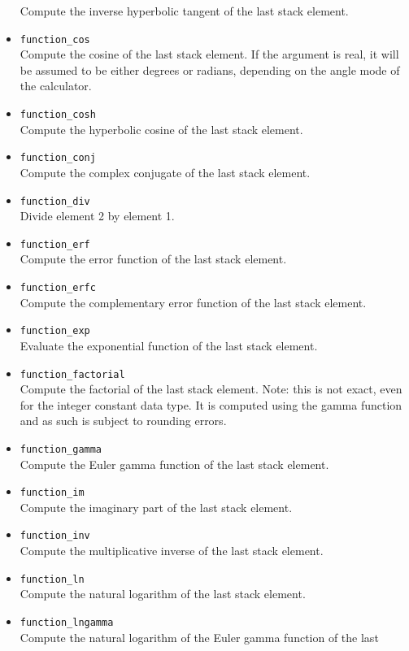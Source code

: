 \documentclass[11pt,notitlepage]{article}
\begin{document}
\begin{itemize}
      Compute the inverse hyperbolic tangent of the last stack element.
   \item {\tt function\_cos} \\
      Compute the cosine of the last stack element.  If the argument is real,
      it will be assumed to be either degrees or radians, depending on the
      angle mode of the calculator.
   \item {\tt function\_cosh} \\
      Compute the hyperbolic cosine of the last stack element.
   \item {\tt function\_conj} \\
      Compute the complex conjugate of the last stack element.
   \item {\tt function\_div} \\
      Divide element 2 by element 1.
   \item {\tt function\_erf} \\
      Compute the error function of the last stack element.
   \item {\tt function\_erfc} \\
      Compute the complementary error function of the last stack element.
   \item {\tt function\_exp} \\
      Evaluate the exponential function of the last stack element.
   \item {\tt function\_factorial} \\
      Compute the factorial of the last stack element.  Note: this is not
      exact, even for the integer constant data type.  It is computed using
      the gamma function and as such is subject to rounding errors.
   \item {\tt function\_gamma} \\
      Compute the Euler gamma function of the last stack element.
   \item {\tt function\_im} \\
      Compute the imaginary part of the last stack element.
   \item {\tt function\_inv} \\
      Compute the multiplicative inverse of the last stack element.
   \item {\tt function\_ln} \\
      Compute the natural logarithm of the last stack element.
   \item {\tt function\_lngamma} \\
      Compute the natural logarithm of the Euler gamma function of the last

\end{itemize}
\end{document}
